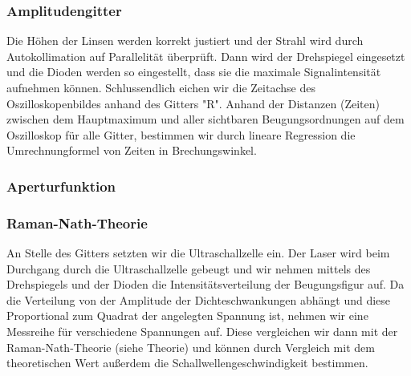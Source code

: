 \subsubsection{Amplitudengitter}

Die H\"ohen der Linsen werden korrekt justiert und der Strahl wird durch Autokollimation auf Parallelit\"at \"uberpr\"uft. Dann wird der Drehspiegel eingesetzt und die Dioden werden so eingestellt, dass sie die maximale Signalintensit\"at aufnehmen k\"onnen. Schlussendlich eichen wir die Zeitachse des Oszilloskopenbildes anhand des Gitters "R". Anhand der Distanzen (Zeiten) zwischen dem Hauptmaximum und aller sichtbaren Beugungsordnungen auf dem Oszilloskop f\"ur alle Gitter, bestimmen wir durch lineare Regression die Umrechnungformel von Zeiten in Brechungswinkel.

\subsubsection{Aperturfunktion}

\subsubsection{Raman-Nath-Theorie}

An Stelle des Gitters setzten wir die Ultraschallzelle ein. Der Laser wird beim Durchgang durch die Ultraschallzelle gebeugt und wir nehmen mittels des Drehspiegels und der Dioden die Intensitätsverteilung der Beugungsfigur auf. Da die Verteilung von der Amplitude der Dichteschwankungen abhängt und diese Proportional zum Quadrat der angelegten Spannung ist, nehmen wir eine Messreihe für verschiedene Spannungen auf. Diese vergleichen wir dann mit der Raman-Nath-Theorie (siehe Theorie) und können durch Vergleich mit dem theoretischen Wert außerdem die Schallwellengeschwindigkeit bestimmen.

\clearpage